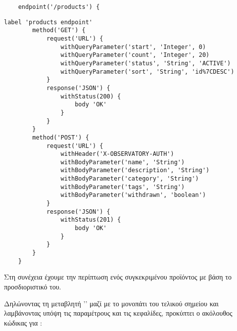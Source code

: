     \begin{lstlisting}
    endpoint('/products') {
    \end{lstlisting}
    \begin{lstlisting}[deletekeywords={endpoint,description}]
        label 'products endpoint'
        method('GET') {
            request('URL') {
                withQueryParameter('start', 'Integer', 0)
                withQueryParameter('count', 'Integer', 20)
                withQueryParameter('status', 'String', 'ACTIVE')
                withQueryParameter('sort', 'String', 'id%7CDESC')
            }
            response('JSON') {
                withStatus(200) {
                    body 'OK'
                }
            }
        }
        method('POST') {
            request('URL') {
                withHeader('X-OBSERVATORY-AUTH')
                withBodyParameter('name', 'String')
                withBodyParameter('description', 'String')
                withBodyParameter('category', 'String')
                withBodyParameter('tags', 'String')
                withBodyParameter('withdrawn', 'boolean')
            }
            response('JSON') {
                withStatus(201) {
                    body 'OK'
                }
            }
        }
    }
    \end{lstlisting}

    Στη συνέχεια έχουμε την περίπτωση ενός συγκεκριμένου προϊόντος με βάση το προσδιοριστικό  του.

    Δηλώνοντας τη μεταβλητή '' μαζί με το μονοπάτι του τελικού σημείου
    και λαμβάνοντας υπόψη τις παραμέτρους και τις κεφαλίδες,
    προκύπτει ο ακόλουθος κώδικας για :

